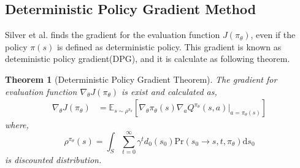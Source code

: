 \documentclass[english, dvipdfmx]{ampmt}             %
\newcommand{\expect}{\mathbb{E}}
\newtheorem{th.}{Theorem}
\begin{document}
\subsection{Deterministic Policy Gradient Method}
Silver et al.\cite{DPG} finds the gradient for the evaluation function $J(\pi_{\theta})$, even if the policy $\pi(s)$ is defined as deterministic policy. This gradient is known as deteministic policy gradient(DPG), and it is calculate as following theorem.
\begin{th.}[Deterministic Policy Gradient Theorem]
The gradient for evaluation function $\nabla_{\theta}J(\pi_{\theta})$ is exist and calculated as, 
\begin{align}
	\nabla_{\theta}J(\pi_{\theta}) &= \expect_{s\sim\rho^{\pi_{\theta}}}[
	\nabla_{\theta}\pi_{\theta}(s)\nabla_{a}Q^{\pi_{\theta}}(s, a)|_{a=\pi_{\theta}(s)}] \label{true_pg} 
\end{align}
where, 
\begin{equation}
	\rho^{\pi_{\theta}}(s) = \int_{S}\sum_{t=0}^{\infty}\gamma^td_0(s_0)\textrm{Pr}(s_0\to s, t,  \pi_{\theta})\textrm{d}s_0
\end{equation}
is discounted distribution.
\end{th.}
\end{document}
